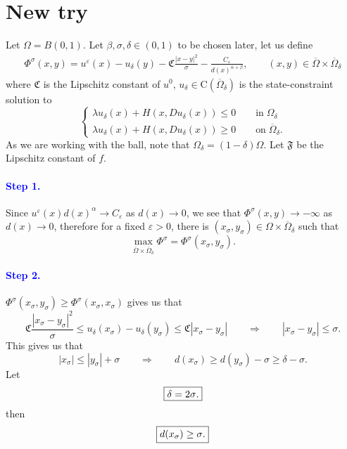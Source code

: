 \documentclass[11pt,reqno]{amsart}
\numberwithin{figure}{section}
\theoremstyle{plain}
\theoremstyle{remark}
\numberwithin{equation}{section}
\begin{document}
\newpage
\section{New try}
\noindent Let $\Omega = B(0,1)$. Let $\beta,\sigma,\delta \in (0,1)$ to be chosen later, let us define
\begin{align*}
    \Phi^{\sigma}(x,y) =  u^\varepsilon(x) - u_\delta(y) - \mathfrak{C}\frac{|x-y|^2}{\sigma}- \frac{C_\varepsilon}{d(x)^{\alpha+\beta}}, \qquad (x,y)\in \overline{\Omega}\times\overline{\Omega}_\delta
\end{align*}
where $\mathfrak{C}$ is the Lipschitz constant of $u^0$, $u_\delta\in \mathrm{C}(\overline{\Omega}_\delta)$ is the state-constraint solution to
\begin{equation*}
    \begin{cases}
    \lambda u_\delta(x) + H(x,Du_\delta(x)) \leq 0 \qquad\text{in}\; \Omega_\delta\\
    \lambda u_\delta(x) + H(x,Du_\delta(x)) \geq 0 \qquad\text{on}\; \overline{\Omega}_\delta.
    \end{cases}
\end{equation*}
As we are working with the ball, note that $\Omega_\delta = (1-\delta)\Omega$. Let $\mathfrak{F}$ be the Lipschitz constant of $f$.
\paragraph{\textcolor{blue}{\textbf{Step 1.}}} Since $u^\varepsilon (x)d(x)^\alpha \to C_\varepsilon$ as $d(x)\to 0$, we see that $\Phi^\sigma(x,y)\to -\infty$ as $d(x)\to 0$, therefore for a fixed $\varepsilon>0$, there is $(x_{\sigma},y_\sigma)\in \Omega\times\overline{\Omega}_\delta$ such that 
\begin{equation*}
    \max_{\overline{\Omega}\times \overline{\Omega}_\delta} \Phi^\sigma = \Phi^\sigma(x_\sigma,y_\sigma).
\end{equation*}
\paragraph{\textcolor{blue}{\textbf{Step 2.}}} $\Phi^\sigma(x_\sigma,y_\sigma) \geq \Phi^\sigma(x_\sigma,x_\sigma)$ gives us that
    \begin{equation}\label{e:est_sigma2}
        \mathfrak{C}\frac{|x_\sigma-y_\sigma|^2}{\sigma} \leq u_\delta(x_\sigma) - u_\delta(y_\sigma) \leq \mathfrak{C}|x_\sigma-y_\sigma| \qquad\Longrightarrow\qquad |x_\sigma -y _\sigma|\leq \sigma.
    \end{equation}
    This gives us that
    \begin{equation}\label{e:est_sigma3}
        |x_\sigma|\leq |y_\sigma|+\sigma \qquad\Longrightarrow\qquad d(x_\sigma) \geq d(y_\sigma) - \sigma\geq \delta-\sigma.
    \end{equation}
Let 
\begin{equation*}
   \fbox{$\displaystyle \delta = 2\sigma$.}
\end{equation*}
then 
\begin{equation*}
    \fbox{$d(x_\sigma) \geq \sigma$.}
\end{equation*}
\end{document}
